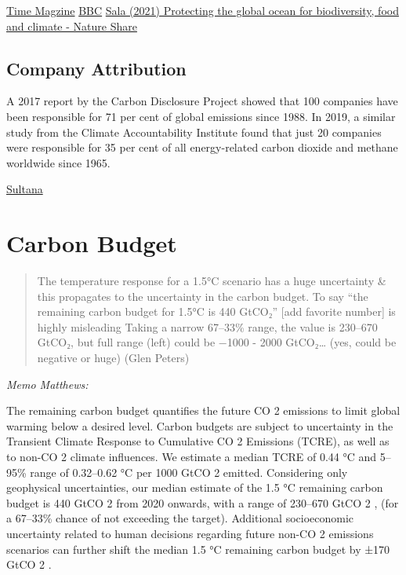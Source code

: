 \documentclass[
]{book}
\begin{document}
\href{https://time.com/5947430/bottom-trawling-carbon-emissions-study/}{Time Magzine}
\href{https://www.bbc.com/news/science-environment-56430542}{BBC}
\href{https://www.nature.com/articles/s41586-021-03371-z.epdf?sharing_token=6Sow3BIdqBYvlWAiGEDpk9RgN0jAjWel9jnR3ZoTv0MwjSp_dqdYRo11ccDn9dqPW5D1xJuK8fpT__q4KFNUwr3chDwJyG9IO5W1aWFy5onfZKtxUPkvQTnzNtoVopyg-N66E6j3SdEzqNh2UnnVHpANtYD9CYy7I3QNIz6iI184RD1jaDt2fU8Yl8bdsQppKG7J6tfBiSTN74eTrygUTMPeqTv4M1289Ys38rtf2Cu5Gfo8iuQxzcCwuSri_N3NIdmY-iR2Af8IOP_F9-p_RA\%3D\%3D\&tracking_referrer=time.com}{Sala (2021) Protecting the global ocean for biodiversity, food and climate - Nature Share}

\hypertarget{company-attribution}{%
\section{Company Attribution}\label{company-attribution}}

A 2017 report by the Carbon Disclosure Project showed that 100 companies have been responsible for 71 per cent of global emissions since 1988. In 2019, a similar study from the Climate Accountability Institute found that just 20 companies were responsible for 35 per cent of all energy-related carbon dioxide and methane worldwide since 1965.

\href{https://tribunemag.co.uk/2021/03/paper-straws-are-not-enough}{Sultana}

\hypertarget{carbon-budget}{%
\chapter{Carbon Budget}\label{carbon-budget}}

\begin{quote}
The temperature response for a 1.5°C scenario has a huge uncertainty \& this propagates to the uncertainty in the carbon budget.
To say ``the remaining carbon budget for 1.5°C is 440 GtCO₂'' {[}add favorite number{]} is highly misleading
Taking a narrow 67--33\% range, the value is 230--670 GtCO₂, but full range (left) could be −1000 - 2000 GtCO₂\ldots{} (yes, could be negative or huge)
(Glen Peters)
\end{quote}

\emph{Memo Matthews:}

The remaining carbon budget quantifies the future CO 2 emissions to limit global warming
below a desired level. Carbon budgets are subject to uncertainty in the Transient Climate
Response to Cumulative CO 2 Emissions (TCRE), as well as to non-CO 2 climate influences.
We estimate a median TCRE of 0.44 °C and 5--95\% range of 0.32--0.62 °C per 1000 GtCO 2
emitted. Considering only geophysical uncertainties, our median estimate of the 1.5 °C
remaining carbon budget is 440 GtCO 2 from 2020 onwards, with a range of 230--670
GtCO 2 , (for a 67--33\% chance of not exceeding the target). Additional socioeconomic
uncertainty related to human decisions regarding future non-CO 2 emissions scenarios can
further shift the median 1.5 °C remaining carbon budget by ±170 GtCO 2 .
\end{document}
